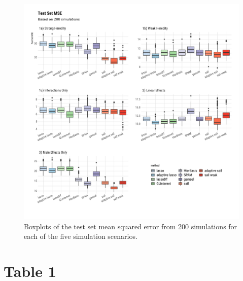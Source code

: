 \documentclass[12pt,letter]{article}\usepackage[]{graphicx}\usepackage[]{color}
\newenvironment{knitrout}{}{} %
\begin{document}
\begin{knitrout}\scriptsize
{}\color{fgcolor}\begin{figure}[h]

{\centering \includegraphics[width=1\linewidth]{figure/plot-mse-sim-1} 

}

\caption[Boxplots of the test set mean squared error from 200 simulations for each of the five simulation scenarios]{Boxplots of the test set mean squared error from 200 simulations for each of the five simulation scenarios.}\label{fig:plot-mse-sim}
\end{figure}

\end{knitrout}



\section{Table 1}






%
%
%
\end{document}
